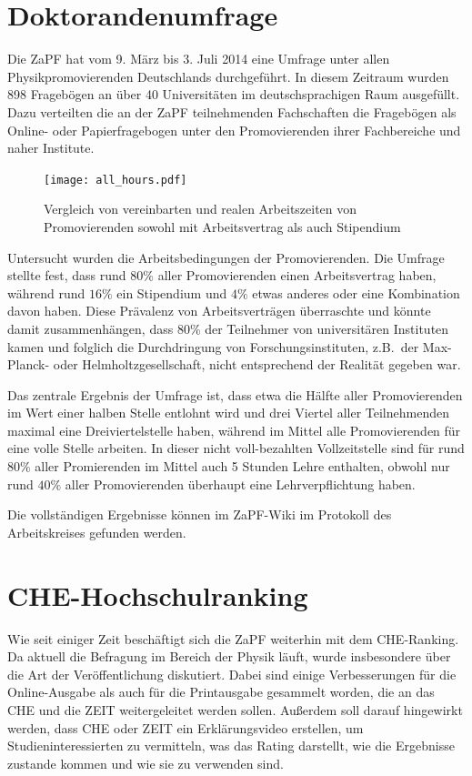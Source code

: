 \documentclass{scrartcl}
\begin{document}
\section*{Doktorandenumfrage}
Die ZaPF hat vom 9. März bis 3. Juli 2014 eine Umfrage unter allen Physikpromovierenden Deutschlands durchgeführt. In diesem Zeitraum wurden 898 Fragebögen an über 40 Universitäten im deutschsprachigen Raum ausgefüllt. Dazu verteilten die an der ZaPF teilnehmenden Fachschaften die Fragebögen als Online- oder Papierfragebogen unter den Promovierenden ihrer Fachbereiche und naher Institute.

\begin{figure}
	\texttt{[image: all\_hours.pdf]}
	\caption{Vergleich von vereinbarten und realen Arbeitszeiten von Promovierenden sowohl mit Arbeitsvertrag als auch Stipendium}
\end{figure}

Untersucht wurden die Arbeitsbedingungen der Promovierenden. Die Umfrage stellte fest, dass rund \(80\%\) aller Promovierenden einen Arbeitsvertrag haben, während rund \(16\%\) ein Stipendium und \(4\%\) etwas anderes oder eine Kombination davon haben. Diese Prävalenz von Arbeitsverträgen überraschte und könnte damit zusammenhängen, dass 80\% der Teilnehmer von universitären Instituten kamen und folglich die Durchdringung von Forschungsinstituten, z.B.\ der Max-Planck- oder Helmholtzgesellschaft, nicht entsprechend der Realität gegeben war.

Das zentrale Ergebnis der Umfrage ist, dass etwa die Hälfte aller Promovierenden im Wert einer halben Stelle entlohnt wird und drei Viertel aller Teilnehmenden maximal eine Dreiviertelstelle haben, während im Mittel alle Promovierenden für eine volle Stelle arbeiten.
In dieser nicht voll-bezahlten Vollzeitstelle sind für rund \(80\%\) aller Promierenden im Mittel auch 5 Stunden Lehre enthalten, obwohl nur rund \(40\%\) aller Promovierenden überhaupt eine Lehrverpflichtung haben.

Die vollständigen Ergebnisse können im ZaPF-Wiki im Protokoll des Arbeitskreises gefunden werden.

\section*{CHE-Hochschulranking}
Wie seit einiger Zeit beschäftigt sich die ZaPF weiterhin mit dem CHE-Ranking. Da aktuell die Befragung im Bereich der Physik läuft, wurde insbesondere über die Art der Veröffentlichung diskutiert. Dabei sind einige  Verbesserungen für die Online-Ausgabe als auch  für die  Printausgabe gesammelt worden, die an das CHE und die ZEIT weitergeleitet werden sollen. Außerdem soll darauf hingewirkt werden, dass CHE oder ZEIT ein Erklärungsvideo erstellen, um Studieninteressierten zu vermitteln, was das Rating darstellt, wie die Ergebnisse zustande kommen und wie sie zu verwenden sind.
\end{document}
